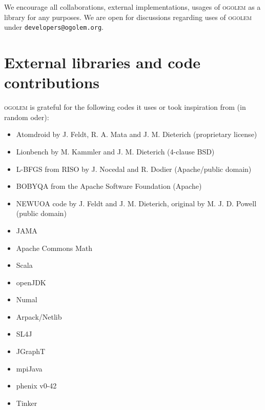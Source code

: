 \documentclass[a4paper,10pt]{scrbook}
\newcommand{\ogo}{\textsc{ogolem}}
\begin{document}
We encourage all collaborations, external implementations, usages of \ogo{} as 
a library for any purposes. We are open for discussions regarding uses of 
\ogo{} under \texttt{developers@ogolem.org}.

\section{External libraries and code contributions}
\ogo{} is grateful for the following codes it uses or took inspiration from (in
random oder):
\begin{itemize}
 \item Atomdroid by J. Feldt, R. A. Mata and J. M. Dieterich (proprietary
license)
 \item Lionbench by M. Kammler and J. M. Dieterich (4-clause BSD)
 \item L-BFGS from RISO by J. Nocedal and R. Dodier (Apache/public domain)
 \item BOBYQA from the Apache Software Foundation (Apache)
 \item NEWUOA code by J. Feldt and J. M. Dieterich, original by M. J. D. Powell
(public domain)
 \item JAMA
 \item Apache Commons Math
 \item Scala
 \item openJDK
 \item Numal
 \item Arpack/Netlib
 \item SL4J
 \item JGraphT
 \item mpiJava
 \item phenix v0-42
 \item Tinker
\end{itemize}    
\end{document}
